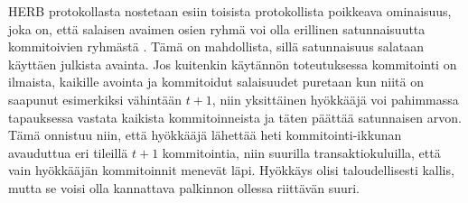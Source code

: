 HERB protokollasta nostetaan esiin toisista protokollista poikkeava ominaisuus, joka on, että salaisen avaimen osien ryhmä voi olla erillinen satunnaisuutta kommitoivien ryhmästä \cite{cherniaeva2019homomorphic}. Tämä on mahdollista, sillä satunnaisuus salataan käyttäen julkista avainta. Jos kuitenkin käytännön toteutuksessa kommitointi on ilmaista, kaikille avointa ja kommitoidut salaisuudet puretaan kun niitä on saapunut esimerkiksi vähintään $t+1$, niin yksittäinen hyökkääjä voi pahimmassa tapauksessa vastata kaikista kommitoinneista ja täten päättää satunnaisen arvon. Tämä onnistuu niin, että hyökkääjä lähettää heti kommitointi-ikkunan avauduttua eri tileillä $t+1$ kommitointia, niin suurilla transaktiokuluilla, että vain hyökkääjän kommitoinnit menevät läpi. Hyökkäys olisi taloudellisesti kallis, mutta se voisi olla kannattava palkinnon ollessa riittävän suuri.